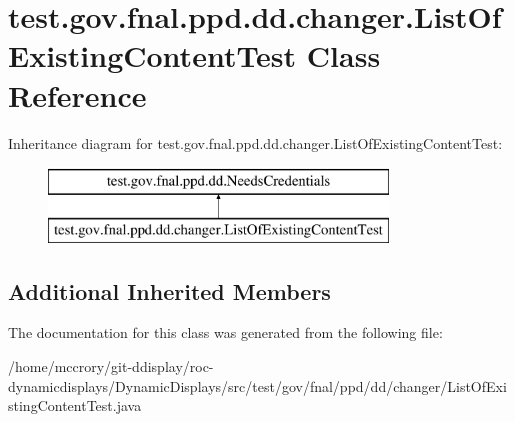 \hypertarget{classtest_1_1gov_1_1fnal_1_1ppd_1_1dd_1_1changer_1_1ListOfExistingContentTest}{\section{test.\-gov.\-fnal.\-ppd.\-dd.\-changer.\-List\-Of\-Existing\-Content\-Test Class Reference}
\label{classtest_1_1gov_1_1fnal_1_1ppd_1_1dd_1_1changer_1_1ListOfExistingContentTest}
}
Inheritance diagram for test.\-gov.\-fnal.\-ppd.\-dd.\-changer.\-List\-Of\-Existing\-Content\-Test\-:\begin{figure}[H]
\begin{center}
\leavevmode
\includegraphics[height=2.000000cm]{classtest_1_1gov_1_1fnal_1_1ppd_1_1dd_1_1changer_1_1ListOfExistingContentTest}
\end{center}
\end{figure}
\subsection*{Additional Inherited Members}


The documentation for this class was generated from the following file\-:\begin{DoxyCompactItemize}
\item 
/home/mccrory/git-\/ddisplay/roc-\/dynamicdisplays/\-Dynamic\-Displays/src/test/gov/fnal/ppd/dd/changer/List\-Of\-Existing\-Content\-Test.\-java\end{DoxyCompactItemize}

